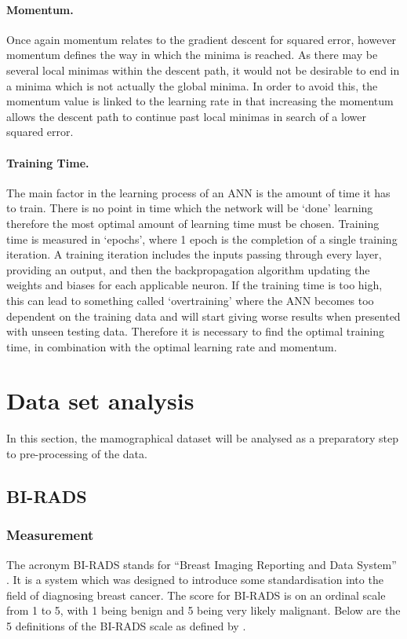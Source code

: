 \documentclass[12pt]{article}
\begin{document}
      \paragraph{Momentum.}
        Once again momentum relates to the gradient descent for squared error, however momentum defines the way in which the minima is reached. As there may be several local minimas within the descent path, it would not be desirable to end in a minima which is not actually the global minima. In order to avoid this, the momentum value is linked to the learning rate in that increasing the momentum allows the descent path to continue past local minimas in search of a lower squared error.

      \paragraph{Training Time.}
        The main factor in the learning process of an ANN is the amount of time it has to train. There is no point in time which the network will be ‘done’ learning therefore the most optimal amount of learning time must be chosen. Training time is measured in ‘epochs’, where 1 epoch is the completion of a single training iteration. A training iteration includes the inputs passing through every layer, providing an output, and then the backpropagation algorithm updating the weights and biases for each applicable neuron. If the training time is too high, this can lead to something called ‘overtraining’ where the ANN becomes too dependent on the training data and will start giving worse results when presented with unseen testing data. Therefore it is necessary to find the optimal training time, in combination with the optimal learning rate and momentum.

\section{Data set analysis} \label{data-set-analysis}
  In this section, the mamographical dataset will be analysed as a preparatory step to pre-processing of the data.

    \subsection{BI-RADS} \label{birad}
      \subsubsection{Measurement}
        The acronym BI-RADS stands for “Breast Imaging Reporting and Data System” \citep{american1998breast}. It is a system which was designed to introduce some standardisation into the field of diagnosing breast cancer. The score for BI-RADS is on an ordinal scale from 1 to 5, with 1 being benign and 5 being very likely malignant.
        Below are the 5 definitions of the BI-RADS scale as defined by \cite{american1998breast}.
\end{document}
